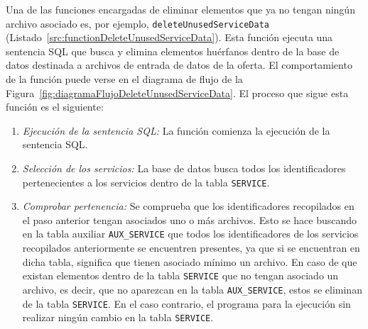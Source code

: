 
Una de las funciones encargadas de eliminar elementos que ya no tengan ningún archivo asociado es, por ejemplo, \texttt{deleteUnusedServiceData} (Listado~\ref{src:functionDeleteUnusedServiceData}). Esta función ejecuta una sentencia \acrshort{SQL} que busca y elimina elementos huérfanos dentro de la base de datos destinada a archivos de entrada de datos de la oferta. El comportamiento de la función puede verse en el diagrama de flujo de la Figura~\ref{fig:diagramaFlujoDeleteUnusedServiceData}. El proceso que sigue esta función es el siguiente:
    \begin{enumerate}
        \item \textit{Ejecución de la sentencia \acrshort{SQL}:} La función comienza la ejecución de la sentencia \acrshort{SQL}.
        \item \textit{Selección de los servicios:} La base de datos busca todos los identificadores pertenecientes a los servicios dentro de la tabla \texttt{SERVICE}.
        \item \textit{Comprobar pertenencia:} Se comprueba que los identificadores recopilados en el paso anterior tengan asociados uno o más archivos. Esto se hace buscando en la tabla auxiliar \texttt{AUX\_SERVICE} que todos los identificadores de los servicios recopilados anteriormente se encuentren presentes, ya que si se encuentran en dicha tabla, significa que tienen asociado mínimo un archivo. En caso de que existan elementos dentro de la tabla \texttt{SERVICE} que no tengan asociado un archivo, es decir, que no aparezcan en la tabla \texttt{AUX\_SERVICE}, estos se eliminan de la tabla \texttt{SERVICE}. En el caso contrario, el programa para la ejecución sin realizar ningún cambio en la tabla \texttt{SERVICE}.
    \end{enumerate}

